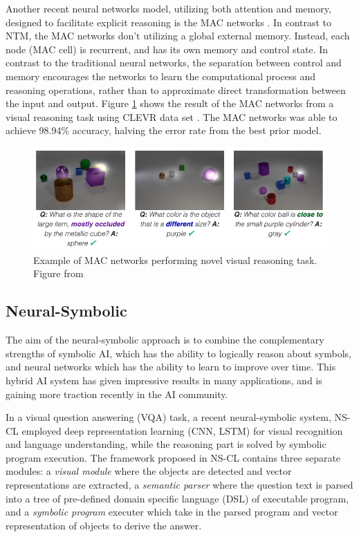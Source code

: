\documentclass[journal]{IEEEtran}
\begin{document}
Another recent neural networks model, utilizing both attention and memory, designed to facilitate explicit reasoning is the MAC networks \cite{hudson2018compositional}.
In contrast to NTM, the MAC networks don't utilizing a global external memory. Instead, each node (MAC cell) is recurrent, and has its own memory and control state.
In contrast to the traditional neural networks, the separation between control and memory encourages the networks to 
learn the computational process and reasoning operations, rather than to approximate direct transformation between the input and output.
Figure \ref{mac-clevr} shows the result of the MAC networks from a visual reasoning task using CLEVR data set \cite{johnson2017clevr}. 
The MAC networks was able to achieve 98.94\% accuracy, halving the error rate from the best prior model.
\begin{figure}[htb]
  \includegraphics[width=\linewidth]{mac-clevr.png}
  \caption{Example of MAC networks performing novel visual reasoning task. Figure from \cite{hudson2018compositional}}
  \label{mac-clevr}
\end{figure}

\subsection{Neural-Symbolic}
The aim of the neural-symbolic approach is to combine the complementary strengths of symbolic AI,
which has the ability to logically reason about symbols, and neural networks which has the ability to learn to improve over time.
This hybrid AI system has given impressive results in many applications, and is gaining more traction recently in the AI community.

In a visual question answering (VQA) task, a recent neural-symbolic system, NS-CL \cite{Mao2019NeuroSymbolic} employed deep representation learning (CNN, LSTM)
for visual recognition and language understanding, while the reasoning part is solved by symbolic program execution.
The framework proposed in NS-CL contains three separate modules: 
a \textit{visual module} where the objects are detected and vector representations are extracted, 
a \textit{semantic parser} where the question text is parsed into a tree of pre-defined domain specific language (DSL) of executable program,
and a \textit{symbolic program} executer which take in the parsed program and vector representation of objects to derive the answer. 
\end{document}
